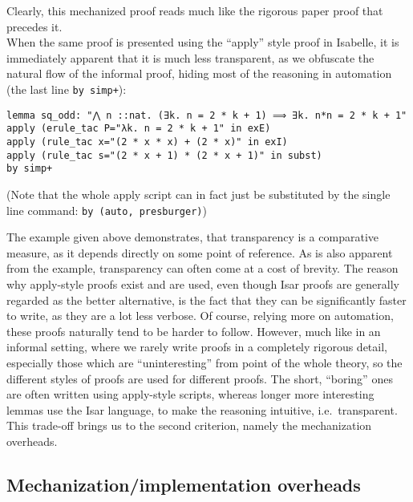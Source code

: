 \documentclass[a4paper, 12pt, twoside]{style/ociamthesis}
\theoremstyle{plain}
\theoremstyle{definition}
\newtheorem{Example}{Example}[chapter]
\theoremstyle{remark}
\renewenvironment{Example}{\begin{OldExample}\begin{mdframed}[style=example, linecolor=yellow]}{\end{mdframed}\end{OldExample}}
\begin{document}
\begin{Example}
Clearly, this mechanized proof reads much like the rigorous paper proof
that precedes it.\\
When the same proof is presented using the ``apply'' style proof in
Isabelle, it is immediately apparent that it is much less transparent,
as we obfuscate the natural flow of the informal proof, hiding most of
the reasoning in automation (the last line \texttt{by simp+}):

\begin{verbatim}
lemma sq_odd: "⋀ n ::nat. (∃k. n = 2 * k + 1) ⟹ ∃k. n*n = 2 * k + 1"
apply (erule_tac P="λk. n = 2 * k + 1" in exE)
apply (rule_tac x="(2 * x * x) + (2 * x)" in exI)
apply (rule_tac s="(2 * x + 1) * (2 * x + 1)" in subst)
by simp+
\end{verbatim}

(Note that the whole apply script can in fact just be substituted by the
single line command: \texttt{by (auto, presburger)})

\end{Example}


The example given above demonstrates, that transparency is a comparative
measure, as it depends directly on some point of reference. As is also
apparent from the example, transparency can often come at a cost of
brevity. The reason why apply-style proofs exist and are used, even
though Isar proofs are generally regarded as the better alternative, is
the fact that they can be significantly faster to write, as they are a
lot less verbose. Of course, relying more on automation, these proofs
naturally tend to be harder to follow. However, much like in an informal
setting, where we rarely write proofs in a completely rigorous detail,
especially those which are ``uninteresting'' from point of the whole
theory, so the different styles of proofs are used for different proofs.
The short, ``boring'' ones are often written using apply-style scripts,
whereas longer more interesting lemmas use the Isar language, to make
the reasoning intuitive, i.e.~transparent.\\
This trade-off brings us to the second criterion, namely the
mechanization overheads.

\subsection{Mechanization/implementation
overheads}\label{mechanizationimplementation-overheads}
\end{document}

